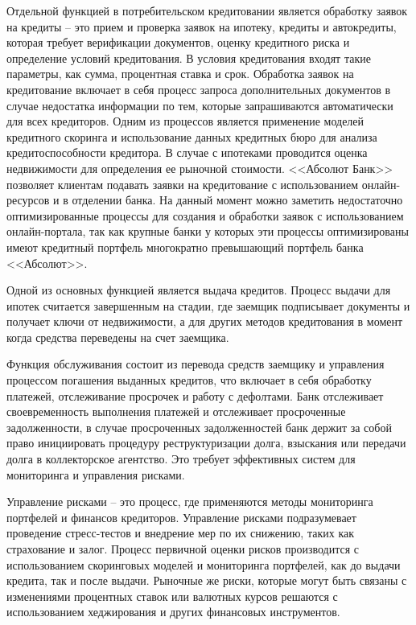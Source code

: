 \documentclass[14pt, a4paper]{extarticle}
\begin{document}
Отдельной функцией в потребительском кредитовании является обработку заявок на
кредиты -- это прием и проверка заявок на ипотеку, кредиты и автокредиты,
которая требует верификации документов, оценку кредитного риска и определение
условий кредитования. В условия кредитования входят такие параметры, как сумма,
процентная ставка и срок. Обработка заявок на кредитование включает в себя
процесс запроса дополнительных документов в случае недостатка информации по
тем, которые запрашиваются автоматически для всех кредиторов. Одним из
процессов является применение моделей кредитного скоринга и использование
данных кредитных бюро для анализа кредитоспособности кредитора. В случае с
ипотеками проводится оценка недвижимости для определения ее рыночной стоимости.
<<Абсолют Банк>> позволяет клиентам подавать заявки на кредитование с
использованием онлайн-ресурсов и в отделении банка. На данный момент можно
заметить недостаточно оптимизированные процессы для создания и обработки заявок
с использованием онлайн-портала, так как крупные банки у которых эти процессы
оптимизированы имеют кредитный портфель многократно превышающий портфель банка
<<Абсолют>>.

Одной из основных функцией является выдача кредитов. Процесс выдачи для ипотек
считается завершенным на стадии, где заемщик подписывает документы и получает
ключи от недвижимости, а для других методов кредитования в момент когда
средства переведены на счет заемщика.

Функция обслуживания состоит из перевода средств
заемщику и управления процессом погашения выданных кредитов, что включает в
себя обработку платежей, отслеживание просрочек и работу с дефолтами. Банк
отслеживает своевременность выполнения платежей и отслеживает просроченные
задолженности, в случае просроченных задолженностей банк держит за собой право
инициировать процедуру реструктуризации долга, взыскания или передачи долга в
коллекторское агентство. Это требует эффективных систем для мониторинга и
управления рисками.

Управление рисками -- это процесс, где применяются методы
мониторинга портфелей и финансов кредиторов. Управление рисками подразумевает
проведение стресс-тестов и внедрение мер по их снижению, таких как страхование
и залог. Процесс первичной оценки рисков производится с использованием
скоринговых моделей и мониторинга портфелей, как до выдачи кредита, так и после
выдачи. Рыночные же риски, которые могут быть связаны с изменениями процентных
ставок или валютных курсов решаются с использованием хеджирования и других
финансовых инструментов.
\end{document}
